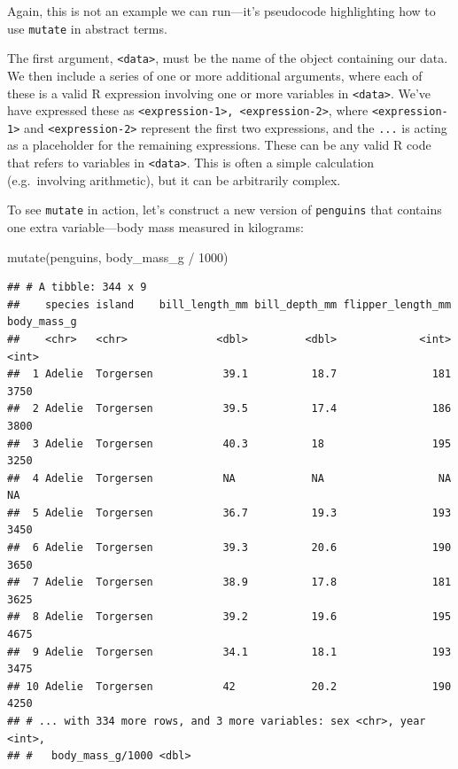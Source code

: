 \documentclass[
]{book}
\newenvironment{Shaded}{\begin{snugshade}}{\end{snugshade}}
\newcommand{\DecValTok}[1]{\textcolor[rgb]{0.00,0.00,0.81}{#1}}
\newcommand{\FunctionTok}[1]{\textcolor[rgb]{0.00,0.00,0.00}{#1}}
\newcommand{\NormalTok}[1]{#1}
\newcommand{\SpecialCharTok}[1]{\textcolor[rgb]{0.00,0.00,0.00}{#1}}
\begin{document}
Again, this is not an example we can run---it's pseudocode highlighting how to use \texttt{mutate} in abstract terms.

The first argument, \texttt{\textless{}data\textgreater{}}, must be the name of the object containing our data. We then include a series of one or more additional arguments, where each of these is a valid R expression involving one or more variables in \texttt{\textless{}data\textgreater{}}. We've have expressed these as \texttt{\textless{}expression-1\textgreater{},\ \textless{}expression-2\textgreater{}}, where \texttt{\textless{}expression-1\textgreater{}} and \texttt{\textless{}expression-2\textgreater{}} represent the first two expressions, and the \texttt{...} is acting as a placeholder for the remaining expressions. These can be any valid R code that refers to variables in \texttt{\textless{}data\textgreater{}}. This is often a simple calculation (e.g.~involving arithmetic), but it can be arbitrarily complex.

To see \texttt{mutate} in action, let's construct a new version of \texttt{penguins} that contains one extra variable---body mass measured in kilograms:

\begin{Shaded}
\begin{Highlighting}[]
\FunctionTok{mutate}\NormalTok{(penguins, body\_mass\_g }\SpecialCharTok{/} \DecValTok{1000}\NormalTok{)}
\end{Highlighting}
\end{Shaded}

\begin{verbatim}
## # A tibble: 344 x 9
##    species island    bill_length_mm bill_depth_mm flipper_length_mm body_mass_g
##    <chr>   <chr>              <dbl>         <dbl>             <int>       <int>
##  1 Adelie  Torgersen           39.1          18.7               181        3750
##  2 Adelie  Torgersen           39.5          17.4               186        3800
##  3 Adelie  Torgersen           40.3          18                 195        3250
##  4 Adelie  Torgersen           NA            NA                  NA          NA
##  5 Adelie  Torgersen           36.7          19.3               193        3450
##  6 Adelie  Torgersen           39.3          20.6               190        3650
##  7 Adelie  Torgersen           38.9          17.8               181        3625
##  8 Adelie  Torgersen           39.2          19.6               195        4675
##  9 Adelie  Torgersen           34.1          18.1               193        3475
## 10 Adelie  Torgersen           42            20.2               190        4250
## # ... with 334 more rows, and 3 more variables: sex <chr>, year <int>,
## #   body_mass_g/1000 <dbl>
\end{verbatim}
\end{document}
